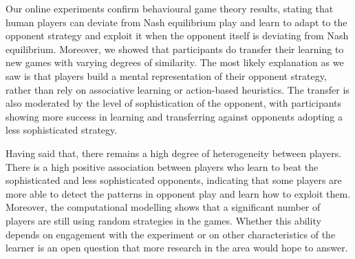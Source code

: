 \documentclass[man,floatsintext]{apa6}
\begin{document}
Our online experiments confirm behavioural game theory results, stating that human players can deviate from Nash equilibrium play and learn to adapt to the opponent strategy and exploit it when the opponent itself is deviating from Nash equilibrium. Moreover, we showed that participants do transfer their learning to new games with varying degrees of similarity. The most likely explanation as we saw is that players build a mental representation of their opponent strategy, rather than rely on associative learning or action-based heuristics. The transfer is also moderated by the level of sophistication of the opponent, with participants showing more success in learning and transferring against opponents adopting a less sophisticated strategy.

Having said that, there remains a high degree of heterogeneity between players. There is a high positive association between players who learn to beat the sophisticated and less sophisticated opponents, indicating that some players are more able to detect the patterns in opponent play and learn how to exploit them. Moreover, the computational modelling shows that a significant number of players are still using random strategies in the games. Whether this ability depends on engagement with the experiment or on other characteristics of the learner is an open question that more research in the area would hope to answer.
\end{document}
